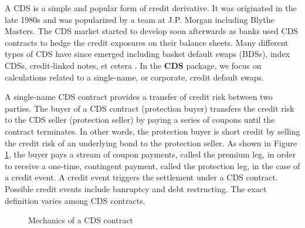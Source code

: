 \documentclass[a4paper]{article}
\begin{document}

A CDS is a simple and popular form of credit derivative. It was
originated in the late 1980s and was popularized by a team at
J.P. Morgan including Blythe Masters.\citep{cdsOrigins,
  blythe} The CDS market started to develop soon afterwards as banks
used CDS contracts to hedge the credit exposures on their balance
sheets. Many different types of CDS have since emerged including
basket default swaps (BDSs), index CDSs, credit-linked notes, et
cetera \citep{jk}. In the \textbf{CDS} package, we focus on calculations
related to a single-name, or corporate, credit default swaps.



A single-name CDS contract provides a transfer of credit risk between
two parties. The buyer of a CDS contract (protection buyer) transfers
the credit risk to the CDS seller (protection seller) by paying a
series of coupons until the contract terminates. In other words, the
protection buyer is short credit by selling the credit risk of an
underlying bond to the protection seller. As shown in Figure
\ref{fig:cashFlow}, the buyer pays a stream of coupon payments, called
the premium leg, in order to receive a one-time, contingent payment,
called the protection leg, in the case of a credit event. A credit
event triggers the settlement under a CDS contract. Possible credit
events include banruptcy and debt restructing. The exact definition
varies among CDS contracts.\\



\begin{figure}
  \caption{\label{fig:cashFlow} Mechanics of a CDS contract}
\begin{center}
\end{center}
\end{figure}
\end{document}
